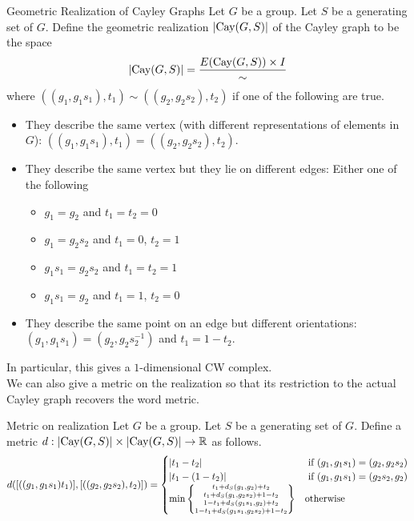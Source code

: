 \documentclass[a4paper]{article}
\begin{document}
\begin{defn}{Geometric Realization of Cayley Graphs}{} Let $G$ be a group. Let $S$ be a generating set of $G$. Define the geometric realization $\abs{\text{Cay}(G,S)}$ of the Cayley graph to be the space $$\abs{\text{Cay}(G,S)}=\frac{E(\text{Cay}(G,S))\times I}{\sim}$$ where $((g_1,g_1s_1),t_1)\sim((g_2,g_2s_2),t_2)$ if one of the following are true. 
\begin{itemize}
\item They describe the same vertex (with different representations of elements in $G$): $((g_1,g_1s_1),t_1)=((g_2,g_2s_2),t_2)$. 
\item They describe the same vertex but they lie on different edges: Either one of the following
\begin{itemize}
\item $g_1=g_2$ and $t_1=t_2=0$
\item $g_1=g_2s_2$ and $t_1=0$, $t_2=1$
\item $g_1s_1=g_2s_2$ and $t_1=t_2=1$
\item $g_1s_1=g_2$ and $t_1=1$, $t_2=0$
\end{itemize}
\item They describe the same point on an edge but different orientations: $(g_1,g_1s_1)=(g_2,g_2s_2^{-1})$ and $t_1=1-t_2$. 
\end{itemize}
\end{defn}

In particular, this gives a $1$-dimensional CW complex. \\

We can also give a metric on the realization so that its restriction to the actual Cayley graph recovers the word metric. 

\begin{defn}{Metric on realization}{} Let $G$ be a group. Let $S$ be a generating set of $G$. Define a metric $d:\abs{\text{Cay}(G,S)}\times\abs{\text{Cay}(G,S)}\to\mathbb{R}$ as follows. $$d([((g_1,g_1s_1)t_1)],[((g_2,g_2s_2),t_2)])=\begin{cases}
\abs{t_1-t_2} & \text{ if } (g_1,g_1s_1)=(g_2,g_2s_2)\\
\abs{t_1-(1-t_2)} & \text{ if }(g_1,g_1s_1)=(g_2s_2,g_2)\\
\min\left\{\substack{t_1+d_S(g_1,g_2)+t_2\\t_1+d_S(g_1,g_2s_2)+1-t_2\\1-t_1+d_S(g_1s_1,g_2)+t_2\\1-t_1+d_S(g_1s_1,g_2s_2)+1-t_2}\right\} & \text{otherwise}
\end{cases}$$
\end{defn}
\end{document}
